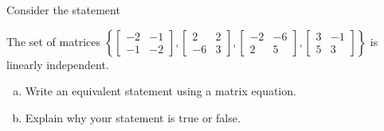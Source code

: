 
\begin{exerciseStatement}


Consider the statement 
\begin{center}\begin{minipage}{0.8\textwidth}
 The set of matrices \( \left\{ \left[\begin{array}{cc}
-2 & -1 \\
-1 & -2
\end{array}\right] , \left[\begin{array}{cc}
2 & 2 \\
-6 & 3
\end{array}\right] , \left[\begin{array}{cc}
-2 & -6 \\
2 & 5
\end{array}\right] , \left[\begin{array}{cc}
3 & -1 \\
5 & 3
\end{array}\right] \right\} \) is linearly independent.
\end{minipage}\end{center}
    


\begin{enumerate}[(a)]
\item  Write an equivalent statement using a matrix equation.
\item  Explain why your statement is true or false.
\end{enumerate}
    
\end{exerciseStatement}
    

